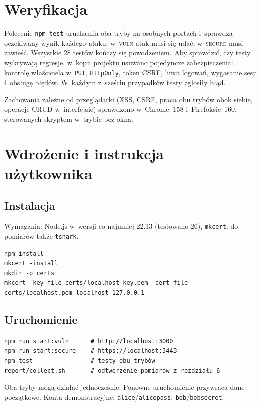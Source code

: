 \documentclass[12pt,a4paper]{article}
\newcommand{\kod}[1]{\texttt{#1}}
\newcommand{\vuln}{\textsc{vuln}}
\newcommand{\secure}{\textsc{secure}}
\begin{document}
\section{Weryfikacja}
Polecenie \kod{npm test} uruchamia oba tryby na osobnych portach i~sprawdza oczekiwany wynik każdego ataku: w~\vuln{} atak musi się udać, w~\secure{} musi zawieść. Wszystkie 28 testów kończy się powodzeniem. Aby sprawdzić, czy testy wykrywają regresje, w~kopii projektu usuwano pojedyncze zabezpieczenia: kontrolę właściciela w~\kod{PUT}, \kod{HttpOnly}, token CSRF, limit logowań, wygasanie sesji i~obsługę błędów. W~każdym z~sześciu przypadków testy zgłosiły błąd.

Zachowania zależne od przeglądarki (XSS, CSRF, praca obu trybów obok siebie, operacje CRUD w~interfejsie) sprawdzono w~Chrome~158 i~Firefoksie~160, sterowanych skryptem w~trybie bez okna.

\section{Wdrożenie i instrukcja użytkownika}

\subsection{Instalacja}
Wymagania: Node.js w~wersji co najmniej 22.13 (testowano 26), \kod{mkcert}; do pomiarów także \kod{tshark}.
\begin{Verbatim}
npm install
mkcert -install
mkdir -p certs
mkcert -key-file certs/localhost-key.pem -cert-file certs/localhost.pem localhost 127.0.0.1
\end{Verbatim}

\subsection{Uruchomienie}
\begin{Verbatim}
npm run start:vuln      # http://localhost:3000
npm run start:secure    # https://localhost:3443
npm test                # testy obu trybów
report/collect.sh       # odtworzenie pomiarów z rozdziału 6
\end{Verbatim}
Oba tryby mogą działać jednocześnie. Ponowne uruchomienie przywraca dane początkowe. Konta demonstracyjne: \kod{alice}/\kod{alicepass}, \kod{bob}/\kod{bobsecret}.
\end{document}

